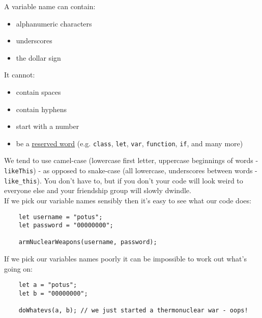 A variable name can contain:

\begin{itemize}
    \item alphanumeric characters
    \item underscores
    \item the dollar sign
\end{itemize}

It cannot:

\begin{itemize}
    \item contain spaces
    \item contain hyphens
    \item start with a number
    \item be a \href{https://developer.mozilla.org/en-US/docs/Web/JavaScript/Reference/Lexical_grammar#Keywords}{reserved word} (e.g. \texttt{class}, \texttt{let}, \texttt{var}, \texttt{function}, \texttt{if}, and many more)
\end{itemize}

We tend to use camel-case (lowercase first letter, uppercase beginnings of words - \texttt{likeThis}) - as opposed to snake-case (all lowercase, underscores between words - \texttt{like\_this}). You don't have to, but if you don't your code will look weird to everyone else and your friendship group will slowly dwindle.
\\

If we pick our variable names sensibly then it's easy to see what our code does:

\begin{verbatim}
    let username = "potus";
    let password = "00000000";

    armNuclearWeapons(username, password);
\end{verbatim}

If we pick our variables names poorly it can be impossible to work out what's going on:

\begin{verbatim}
    let a = "potus";
    let b = "00000000";

    doWhatevs(a, b); // we just started a thermonuclear war - oops!
\end{verbatim}

\pagebreak


